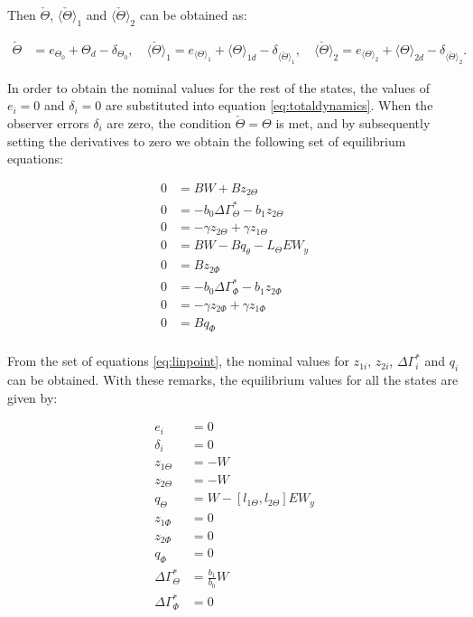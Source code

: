 \documentclass[main.tex]{subfiles}
\begin{document}
	Then $\check{\Theta}$, $\langle \check{\Theta} \rangle_{1}$ and $\langle \check{\Theta} \rangle_{2}$ can be obtained as:
	
	\begin{align}
	\check{\Theta} &= e_{\Theta_0} + \Theta_d - \delta_{\Theta_0}, \quad \langle \check{\Theta} \rangle_{1} = e_{\langle \Theta \rangle_1} + \langle \Theta \rangle_{1d} - \delta_{\langle \check{\Theta} \rangle_{1}}, \quad \langle \check{\Theta} \rangle_{2} = e_{\langle \Theta \rangle_2} + \langle \Theta \rangle_{2d} - \delta_{\langle \check{\Theta} \rangle_{2}}
	\label{eq:esttheta}.
	\end{align}
	
	In order to obtain the nominal values for the rest of the states, the values of $e_i = 0$ and $\delta_i = 0$ are substituted into equation \eqref{eq:totaldynamics}. When the observer errors $\delta_i$ are zero, the condition $\check{\Theta} = \Theta$ is met, and by subsequently setting the derivatives to zero we obtain the following set of equilibrium equations:
	
	\begin{align}
	0 &= BW + Bz_{2\Theta} \nonumber\\
	0 &= -b_0 \Delta \Gamma_\Theta^{*} - b_1 z_{2\Theta} \nonumber\\
	0 &= -\gamma z_{2\Theta} + \gamma z_{1\Theta}	\nonumber\\
	0 &= BW - Bq_\theta \nonumber - L_\Theta E W_y \\
	0 &=  Bz_{2\Phi}\nonumber \\
	0 &= -b_0 \Delta \Gamma_\Phi^{*} - b_1 z_{2\Phi} \nonumber\\
	0 &= -\gamma z_{2\Phi} + \gamma z_{1\Phi}	\nonumber\\
	0 &= Bq_\Phi \nonumber\\
	\label{eq:linpoint}
	\end{align}
	
	From the set of equations \eqref{eq:linpoint}, the nominal values for $z_{1i}$, $z_{2i}$, $\Delta \Gamma_i^*$ and $q_i$ can be obtained. With these remarks, the equilibrium values for all the states are given by:
	
	\begin{align}
		e_i &= 0\nonumber\\
		\delta_i &= 0 \nonumber\\
		z_{1\Theta} &= -W\nonumber\\
		z_{2\Theta} &= -W\nonumber\\
		q_\Theta &= W - [l_{1\Theta}, l_{2\Theta}]E W_y \nonumber\\
		z_{1\Phi} &= 0\nonumber\\
		z_{2\Phi} &= 0\nonumber\\
		q_\Phi &= 0 \nonumber\\
		\Delta \Gamma_\Theta^* &= \frac{b_1}{b_0}W \nonumber\\
		\Delta \Gamma_\Phi^* &= 0 
	\end{align}
	
\end{document}
